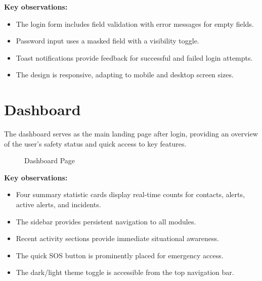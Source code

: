 \textbf{Key observations:}
\begin{itemize}
  \item The login form includes field validation with error messages for empty fields.
  \item Password input uses a masked field with a visibility toggle.
  \item Toast notifications provide feedback for successful and failed login attempts.
  \item The design is responsive, adapting to mobile and desktop screen sizes.
\end{itemize}

\section{Dashboard}

The dashboard serves as the main landing page after login, providing an overview of the user's safety status and quick access to key features.

\begin{figure}[H]
  \centering
  \caption{Dashboard Page}
  \label{fig:screenshot-dashboard}
\end{figure}

\textbf{Key observations:}
\begin{itemize}
  \item Four summary statistic cards display real-time counts for contacts, alerts, active alerts, and incidents.
  \item The sidebar provides persistent navigation to all modules.
  \item Recent activity sections provide immediate situational awareness.
  \item The quick SOS button is prominently placed for emergency access.
  \item The dark/light theme toggle is accessible from the top navigation bar.
\end{itemize}

